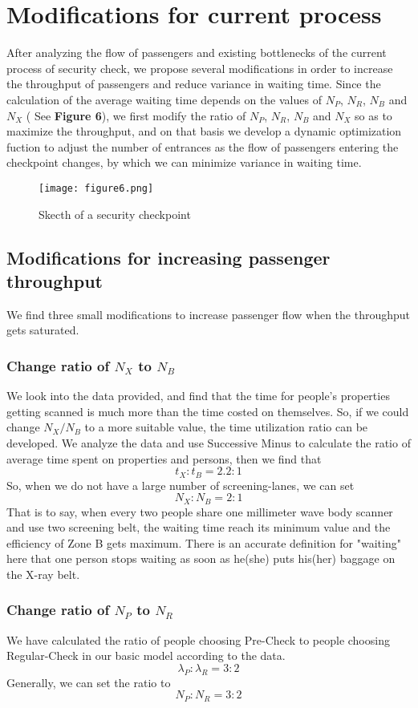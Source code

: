 \documentclass{mcmthesis}
\begin{document}
	\section{Modifications for current process}
	After analyzing the flow of passengers and existing bottlenecks of the current process of security check, we propose several modifications in order to increase the throughput of passengers and reduce variance in waiting time. Since the calculation of the average waiting time depends on the values of $N_P$, $N_R$, $N_B$ and $N_X$ ( See \textbf{Figure 6}), we first modify the ratio of $N_P$, $N_R$, $N_B$ and $N_X$ so as to maximize the throughput, and on that basis we develop a dynamic optimization fuction to adjust the number of entrances as the flow of passengers entering the checkpoint changes, by which we can minimize variance in waiting time.  
	\begin{figure}[h]
		\small
		\centering
		\texttt{[image: figure6.png]}
		\caption{Skecth of a security checkpoint} \label{fig:Skecth of a security checkpoint}
	\end{figure}
	\subsection{Modifications for increasing passenger throughput}
	We find three small modifications to increase passenger flow when the throughput gets saturated.
	\subsubsection{Change ratio of $N_X$ to $N_B$}
	We look into the data provided, and find that the time for people's properties getting scanned is much more than the time costed on themselves. So, if we could change $N_X/N_B$ to a more suitable value, the time utilization ratio can be developed. We analyze the data and use Successive Minus to calculate the ratio of average time spent on properties and persons, then we find that
	$$t_X:t_B=2.2:1$$
	So, when we do not have a large number of screening-lanes, we can set 
	$$N_X:N_B=2:1$$
	That is to say, when every two people share one millimeter wave body scanner and use two screening belt, the waiting time reach its minimum value and the efficiency of Zone B gets maximum. There is an accurate definition for "waiting" here that one person stops waiting as soon as he(she) puts his(her) baggage on the X-ray belt.
	\subsubsection{Change ratio of $N_P$ to $N_R$}
	We have calculated the ratio of people choosing Pre-Check to people choosing Regular-Check in our basic model according to the data.
	$$\lambda_P:\lambda_R=3:2$$
	Generally, we can set the ratio to
	$$N_P:N_R=3:2$$
\end{document}
